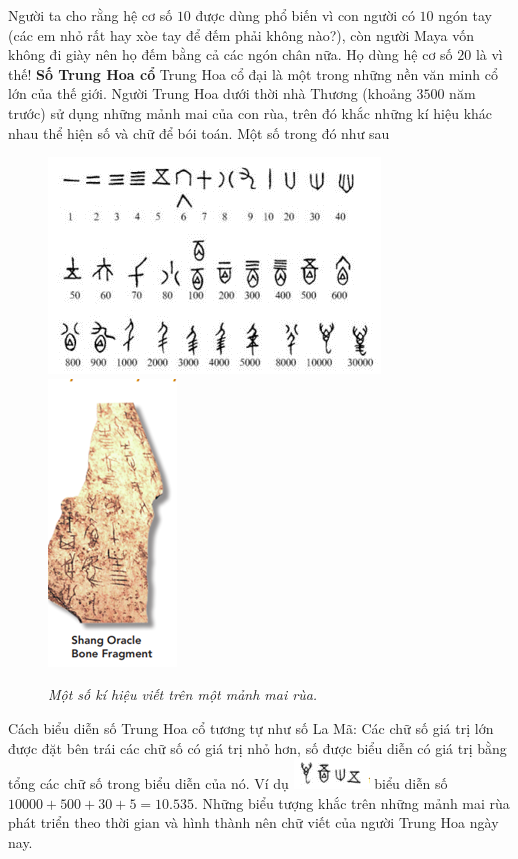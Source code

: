 	\vskip 0.1cm
	Người ta cho rằng hệ cơ số $10$ được dùng phổ biến vì con người có $10$ ngón tay (các em nhỏ rất hay xòe tay để đếm phải không nào?),  còn người Maya vốn không đi giày nên họ đếm bằng cả các ngón chân nữa. Họ dùng hệ cơ số $20$ là vì thế!
	\vskip 0.1cm
	\textbf{\color{toancuabi}Số Trung Hoa cổ}
	\vskip 0.1cm
	Trung Hoa cổ đại là một trong những nền văn minh cổ lớn của thế giới. Người Trung Hoa dưới thời nhà Thương (khoảng $3500$ năm trước) sử dụng những mảnh mai của con rùa, trên đó khắc những kí hiệu khác nhau thể hiện số và chữ để bói toán. Một số trong đó như sau
	\begin{figure}[H]
		\centering
		\vspace*{-5pt}
		\captionsetup{labelformat= empty, justification=centering}
		\includegraphics[height=0.45\linewidth]{40}\quad
		\includegraphics[height=0.45\linewidth]{41}
			\caption{\textit{\color{toancuabi}Một số kí hiệu viết trên một mảnh mai rùa.}}
		\vspace*{-10pt}
	\end{figure}
	Cách biểu diễn số Trung Hoa cổ tương tự như số La Mã: Các chữ số giá trị lớn được đặt bên trái các chữ số có  giá trị nhỏ hơn, số được biểu diễn có giá trị bằng tổng các chữ số trong biểu diễn của nó. Ví dụ \includegraphics{42} biểu diễn số $10000 + 500 + 30 + 5 =10{.}535$. Những biểu tượng khắc trên những mảnh mai rùa phát triển theo thời gian và hình thành nên chữ viết của người Trung Hoa ngày nay. 
